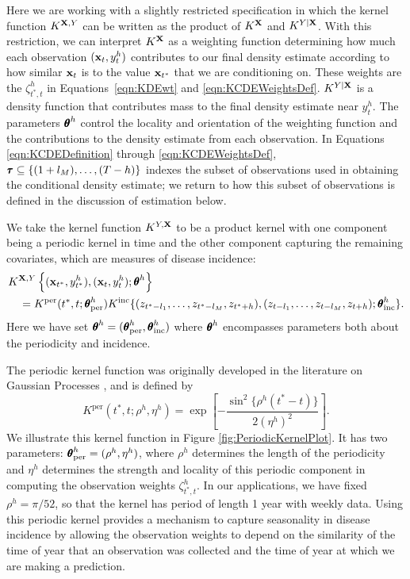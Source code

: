 \documentclass[times, doublespace]{simauth}\usepackage[]{graphicx}\usepackage[]{color}
\begin{document}
Here we are working with a slightly restricted specification in which
the kernel function $K^{{\bf X}, Y}$ can be written as the product of $K^{{\bf X}}$ and $K^{Y\mid{\bf X}}$.
With this restriction, we can
interpret $K^{{\bf X}}$ as a weighting function determining how much each observation
$({\bf x}_t, y^h_t)$ contributes to our final density estimate according to how
similar ${\bf x}_t$ is to the value ${\bf x}_{t^*}$ that we are conditioning on.
These weights are the $\zeta^h_{t^*, t}$ in Equations~\eqref{eqn:KDEwt} and
\eqref{eqn:KCDEWeightsDef}.
$K^{Y \mid {\bf X}}$ is a density function that contributes
mass to the final density estimate near $y^h_t$.  The
parameters $\btheta^h$ control the locality and orientation of the weighting
function and the contributions to the density estimate from each observation.
In Equations \eqref{eqn:KCDEDefinition} through \eqref{eqn:KCDEWeightsDef},
$\btau \subseteq \{(1 + l_M), \ldots, (T - h)\}$ indexes the subset of
observations used in obtaining the conditional density estimate; we return to
how this subset of observations is defined in the discussion of estimation
below.

We take the kernel function $K^{Y, {\bf X}}$ to be a product kernel with one
component being a periodic kernel in time and the other component capturing the
remaining covariates, which are measures of disease incidence:
\begin{align}
&K^{\bX, Y}\left\{(\bx_{t^*}, y^h_{t^*}), (\bx_t, y^h_t); \btheta^h \right\} \nonumber \\
&\quad = K^{\text{per}}(t^*, t; \btheta^h_{\text{per}}) K^{\text{inc}}\{(z_{t^* - l_1}, \ldots, z_{t^* - l_M}, z_{t^* + h}), (z_{t - l_1}, \ldots, z_{t - l_M}, z_{t + h}); \btheta^h_{\text{inc}}\}. \nonumber
\end{align}
Here we have set $\btheta^h = (\btheta^h_{\text{per}}, \btheta^h_{\text{inc}})$ where $\btheta^h$ encompasses parameters both about the periodicity and incidence.

The periodic kernel function was originally developed in the
literature on Gaussian Processes \cite{mackay1998introductionGP}, and is
defined by
\begin{equation}
K^{\text{per}}(t^*, t; \rho^h, \eta^h) = \exp\left[- \frac{\sin^2\{\rho^h (t^* - t)\}}{2(\eta^h)^2} \right]. \label{eqn:PeriodicKernel}
\end{equation}
We illustrate this kernel function in Figure \ref{fig:PeriodicKernelPlot}.
It has two parameters: $\btheta^h_{\text{per}} = (\rho^h, \eta^h)$, where $\rho^h$ determines the length of the
periodicity and $\eta^h$ determines the strength and locality
of this periodic component in computing the observation weights $\zeta_{t^*, t}^h$.
In our applications, we have fixed $\rho^h = \pi / 52$, so that the kernel has
period of length 1 year with weekly data.  Using this periodic kernel provides a
mechanism to capture seasonality in disease incidence by allowing the
observation weights to depend on the similarity of the time of year that an
observation was collected and the time of year at which we are making a prediction.
\end{document}
